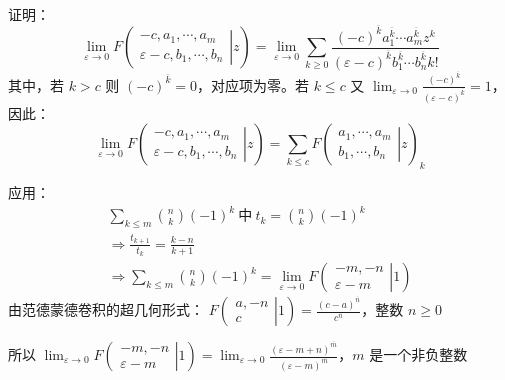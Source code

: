 证明：
\[
  \lim_{\varepsilon \to 0} F
  \left( \left.
    \begin{array}{cccc}
      -c, a_1, \cdots, a_m \\
      \varepsilon - c, b_1, \cdots, b_n
  \end{array} \right|{z} \right) =
  \lim_{\varepsilon \to 0} \sum_{k \ge 0} \frac{(-c)^{\overline{k}} a_1^{\overline{k}} \cdots a_m^{\overline{k}} z^k}{(\varepsilon - c)^{\overline{k}} b_1^{\overline{k}} \cdots b_n^{\overline{k}} k!}
\]
其中，若 \( k > c \) 则 \( (-c)^{\overline{k}} = 0 \)，对应项为零。若 \( k \le c \) 又 \( \lim_{\varepsilon \to 0} \frac{(-c)^{\overline{k}}}{(\varepsilon - c)^{\overline{k}}} = 1 \)，因此：
\[
  \lim_{\varepsilon \to 0} F
  \left( \left.
    \begin{array}{cccc}
      -c, a_1, \cdots, a_m \\
      \varepsilon - c, b_1, \cdots, b_n
  \end{array} \right|{z} \right) =
  \sum_{k \le c} F
  \left( \left.
    \begin{array}{cccc}
      a_1, \cdots, a_m \\
      b_1, \cdots, b_n
  \end{array} \right|{z} \right)_k
\]

应用：
\begin{gather*}
  \sum_{k \le m} \binom{n}{k} (-1)^k \ \text{中} \ t_k = \binom{n}{k} (-1)^k \\
  \Rightarrow \frac{t_{k+1}}{t_k} = \frac{k-n}{k+1} \\
  \Rightarrow \sum_{k \le m} \binom{n}{k} (-1)^k = \lim_{\varepsilon \to 0} F
  \left( \left.
    \begin{array}{cccc}
      -m, -n \\
      \varepsilon - m
  \end{array} \right|{1} \right)
\end{gather*}
由范德蒙德卷积的超几何形式：
\(
  F
  \left( \left.
    \begin{array}{cccc}
      a, -n \\
      c
  \end{array} \right|{1} \right) = \frac{(c-a)^{\overline{n}}}{c^{\overline{n}}}
\)，整数 \( n \ge 0 \)

所以
\(
  \lim_{\varepsilon \to 0} F
  \left( \left.
    \begin{array}{cccc}
      -m, -n \\
      \varepsilon - m
  \end{array} \right|{1} \right) = \lim_{\varepsilon \to 0} \frac{(\varepsilon - m + n)^{\overline{m}}}{(\varepsilon - m)^{\overline{m}}}
\)，\( m \) 是一个非负整数


